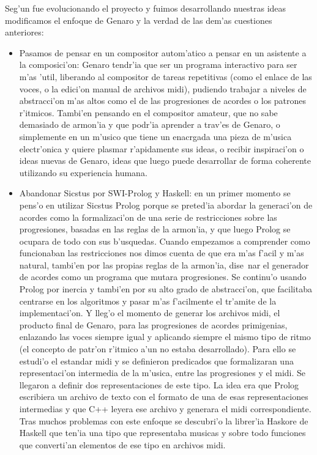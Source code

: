 \documentclass[a4paper,11pt]{article}
\begin{document}
Seg'un fue evolucionando el proyecto y fuimos desarrollando nuestras ideas modificamos el enfoque de Genaro y la verdad de las dem'as cuestiones anteriores:
        \begin{itemize}
        \item Pasamos de pensar en un compositor autom'atico a pensar en un asistente a la composici'on: Genaro tendr'ia que ser un programa interactivo para ser m'as 'util, liberando al compositor de tareas repetitivas (como el enlace de las voces, o la edici'on manual de archivos midi), pudiendo trabajar a niveles de abstracci'on m'as altos como el de las progresiones de acordes o los patrones r'itmicos. Tambi'en pensando en el compositor amateur, que no sabe demasiado de armon'ia y que podr'ia aprender a trav'es de Genaro, o simplemente en un m'usico que tiene un enacrgada una pieza de m'usica electr'onica y quiere plasmar r'apidamente sus ideas, o recibir inspiraci'on o ideas nuevas de Genaro, ideas que luego puede desarrollar de forma coherente utilizando su experiencia humana.
        \item Abandonar Sicstus por SWI-Prolog y Haskell: en un primer momento se pens'o en utilizar Sicstus Prolog porque se preted'ia abordar la generaci'on de acordes como la formalizaci'on de una serie de restricciones sobre las progresiones, basadas en las reglas de la armon'ia, y que luego Prolog se ocupara de todo con sus b'usquedas. Cuando empezamos a comprender como funcionaban las restricciones nos dimos cuenta de que era m'as f'acil y m'as natural, tambi'en por las propias reglas de la armon'ia, dise~nar el generador de acordes como un programa que mutara progresiones.
\newline
Se continu'o usando Prolog por inercia y tambi'en por su alto grado de abstracci'on, que facilitaba centrarse en los algoritmos y pasar m'as f'acilmente el tr'amite de la implementaci'on. Y lleg'o el momento de generar los archivos midi, el producto final de Genaro, para las progresiones de acordes primigenias, enlazando las voces siempre igual y aplicando siempre el mismo tipo de ritmo (el concepto de patr'on r'itmico a'un no estaba desarrollado). Para ello se estudi'o el estandar midi y se definieron predicados que formalizaran una representaci'on intermedia de la m'usica, entre las progresiones y el midi. Se llegaron a definir dos representaciones de este tipo. La idea era que Prolog escribiera un archivo de texto con el formato de una de esas representaciones intermedias y que C++ leyera ese archivo y generara el midi correspondiente. Tras muchos problemas con este enfoque se descubri'o la librer'ia Haskore de Haskell que ten'ia una tipo que representaba musicas y sobre todo funciones que converti'an elementos de ese tipo en archivos midi.

\end{itemize}
\end{document}
